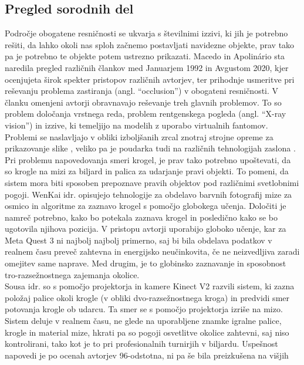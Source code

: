 \documentclass[a4paper, 12pt]{article}
\begin{document}
\subsection{Pregled sorodnih del}
Področje obogatene resničnosti se ukvarja s številnimi izzivi, ki jih je potrebno rešiti, da lahko okoli nas sploh začnemo postavljati navidezne objekte, prav tako pa je potrebno te objekte potem ustrezno prikazati.
Macedo in Apolinário \cite{Macedo2023Occlusion} sta naredila pregled različnih člankov med Januarjem 1992 in Avgustom 2020,  kjer  ocenjujeta širok spekter pristopov različnih avtorjev, ter prihodnje usmeritve pri reševanju problema zastiranja (angl. ``occlusion'') v obogateni resničnosti. V članku omenjeni avtorji \cite{Krajancich2020Factored} obravnavajo reševanje 
treh glavnih problemov. To so problem določanja vrstnega reda, problem rentgenskega pogleda (angl. ``X-ray vision'') in izzive, ki temeljijo na modelih z uporabo virtualnih fantomov. Problemi se naslavljajo v obliki izboljšanih zrcal znotraj strojne opreme za prikazovanje slike \cite{Krajancich2020Factored}, veliko pa je poudarka tudi na različnih tehnologijah zaslona \cite{Zhang2023AddOn}.\\
Pri problemu napovedovanja smeri krogel, je prav tako potrebno upoštevati, da so krogle na mizi za biljard in palica za udarjanje pravi objekti. To pomeni, da sistem mora biti sposoben prepoznave pravih objektov pod različnimi svetlobnimi pogoji. WenKai idr. \cite{WenKai2024} opisujejo tehnologije za
obdelavo barvnih fotografij mize za osmico in algoritme za zaznavo krogel s pomočjo globokega učenja. Določiti je namreč potrebno, kako bo potekala zaznava krogel in posledično kako se bo ugotovila njihova pozicija. V pristopu avtorji uporabijo globoko učenje, kar za Meta
Quest 3 ni najbolj najbolj primerno, saj bi bila obdelava podatkov v realnem času preveč zahtevna in energijsko neučinkovita, če ne neizvedljiva zaradi omejitev same naprave.
Med drugim, je to globinsko zaznavanje in sposobnost tro-razsežnostnega zajemanja okolice. \\
Sousa idr. \cite{Sousa2016} so s pomočjo projektorja in kamere Kinect V2 razvili sistem,
ki zazna položaj palice okoli krogle (v obliki dvo-razsežnostnega kroga) in predvidi smer potovanja krogle ob udarcu. Ta smer se s pomočjo projektorja izriše na mizo. Sistem deluje v realnem času, ne glede na uporabljene znamke igralne palice,
krogle in material mize, hkrati pa so pogoji osvetlitve okolice zahtevni, saj niso kontrolirani, tako kot je
to pri profesionalnih turnirjih v biljardu. Uspešnost napovedi je po ocenah avtorjev 96-odstotna, ni pa še bila preizkušena na višjih 
\end{document}
